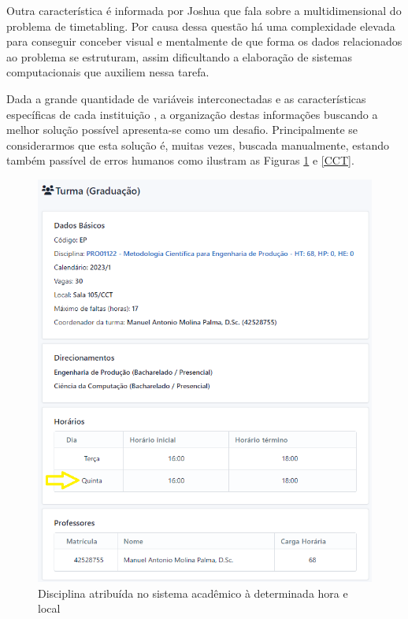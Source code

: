     Outra característica é informada por Joshua \cite{thomas_visualization_2009} que fala sobre a multidimensional do problema de timetabling. Por causa dessa questão há uma complexidade elevada para conseguir conceber visual e mentalmente de que forma os dados relacionados ao problema se estruturam, assim dificultando a elaboração de sistemas computacionais que auxiliem nessa tarefa.

    Dada a grande quantidade de variáveis interconectadas e as características específicas de cada instituição \cite{miranda_udpskeduler_2012}, a organização destas informações buscando a melhor solução possível apresenta-se como um desafio. Principalmente se considerarmos que esta solução é, muitas vezes, buscada manualmente, estando também passível de erros humanos como ilustram as Figuras \ref{Academico} e \ref{CCT}.



    \begin{figure}[htbp]\centering
        \caption{\label{Academico}Disciplina atribuída no sistema acadêmico à determinada hora e local}
        \includegraphics[angle=0,scale=0.8]{files/img/Falha_de_alocacao/Metodologia-Quinta.png}
    \end{figure}    %

